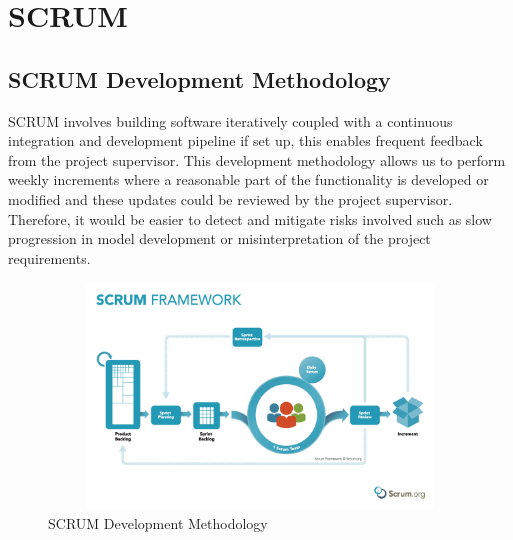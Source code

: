 
\chapter{SCRUM} \label{SCRUM} %


\section*{SCRUM Development Methodology}

SCRUM involves building software iteratively coupled with a continuous integration 
and development pipeline if set up, this enables frequent feedback 
from the project supervisor. This development methodology allows us to 
perform weekly increments where a reasonable part of the functionality is 
developed or modified and these updates could be reviewed by the project 
supervisor. Therefore, it would be easier to detect and mitigate risks involved such as 
slow progression in model development or misinterpretation of the project requirements.

\begin{figure}[th]
    \centering
    \includegraphics[width=15cm, height=6cm]{Images/SCRUM.png}
    \decoRule
    \caption[SCRUM]{SCRUM Development Methodology \cite{SFP}}
    \label{fig:SCRUM}
    \end{figure}